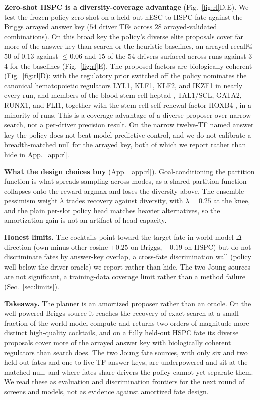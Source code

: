 \documentclass{article}
\begin{document}
\textbf{Zero-shot HSPC is a diversity-coverage advantage} (Fig.~\ref{fig:rl}D,E). We test the frozen policy
zero-shot on a held-out hESC-to-HSPC fate against the Briggs arrayed answer key ($54$ driver TFs across $28$
arrayed-validated combinations). On this broad key the policy's diverse elite proposals cover far more of
the answer key than search or the heuristic baselines, an arrayed recall@$50$ of $0.13$ against $\le0.06$ and
$15$ of the $54$ drivers surfaced across runs against $3$--$4$ for the baselines (Fig.~\ref{fig:rl}E). The
proposed factors are biologically coherent (Fig.~\ref{fig:rl}D): with the regulatory prior switched off the
policy nominates the canonical hematopoietic regulators LYL1, KLF1, KLF2, and IKZF1 in nearly every run, and
members of the blood stem-cell heptad \citep{wilson2010heptad}, TAL1/SCL, GATA2, RUNX1, and FLI1, together with
the stem-cell self-renewal factor HOXB4 \citep{antonchuk2002hoxb4}, in a minority of runs. This is a coverage
advantage of a diverse proposer over narrow search, not a per-driver precision result. On the narrow twelve-TF
named answer key the policy does not beat model-predictive control, and we do not calibrate a breadth-matched null
for the arrayed key, both of which we report rather than hide in App.~\ref{app:rl}.

\textbf{What the design choices buy} (App.~\ref{app:rl}). Goal-conditioning the partition function is what spreads
sampling across modes, as a shared partition function collapses onto the reward argmax and loses the diversity
above. The ensemble-pessimism weight $\lambda$ trades recovery against diversity, with $\lambda{=}0.25$ at the
knee, and the plain per-slot policy head matches heavier alternatives, so the amortization gain is not an artifact
of head capacity.

\textbf{Honest limits.} The cocktails point toward the target fate in world-model $\Delta$-direction
(own-minus-other cosine $+0.25$ on Briggs, $+0.19$ on HSPC) but do not discriminate fates by answer-key overlap, a
cross-fate discrimination wall (policy well below the driver oracle) we report rather than hide. The two Joung
sources are not significant, a training-data coverage limit rather than a method failure (Sec.~\ref{sec:limits}).

\textbf{Takeaway.} The planner is an amortized proposer rather than an oracle. On the well-powered Briggs source it
reaches the recovery of exact search at a small fraction of the world-model compute and returns two orders of
magnitude more distinct high-quality cocktails, and on a fully held-out HSPC fate its diverse proposals cover more
of the arrayed answer key with biologically coherent regulators than search does. The two Joung fate sources,
with only six and two held-out fates and one-to-five-TF answer keys, are underpowered and sit at the matched
null, and where fates share drivers the policy cannot yet separate them. We read these as evaluation and
discrimination frontiers for the next round of screens and models, not as evidence against amortized fate design.
\end{document}
